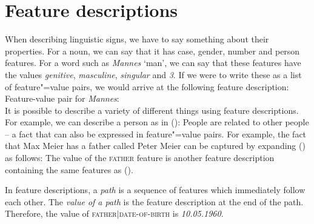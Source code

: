 \section{Feature descriptions}

When describing linguistic signs, we have to say something about their properties. For a noun, we can say that it has case, gender, number and person features.
For a word such as  \emph{Mannes} `man', we can say that these features have the values \emph{genitive}, \emph{masculine}, \emph{singular} and \emph{3}.
If we were to write these as a list of feature"=value pairs, we would arrive at the following feature description:
\eas
Feature-value pair for \emph{Mannes}:\\
\zs
It is possible to describe a variety of different things using feature descriptions. For example, we can describe a person as in ():
\ea
{}
\z
People are related to other people -- a fact that can also be expressed in feature"=value pairs. For example, the fact that Max Meier has a father
called Peter Meier can be captured by expanding () as follows: 
\ea
{}
\z
The value of the \textsc{father} feature is another feature description containing the same features as ().

\addlines
In feature descriptions, a \emph{path} is a sequence of features which immediately follow each other.
The \emph{value of a path} is the feature description at the end of the path. Therefore,
the value of \textsc{father$|$date-of-birth} is \emph{10.05.1960}.

